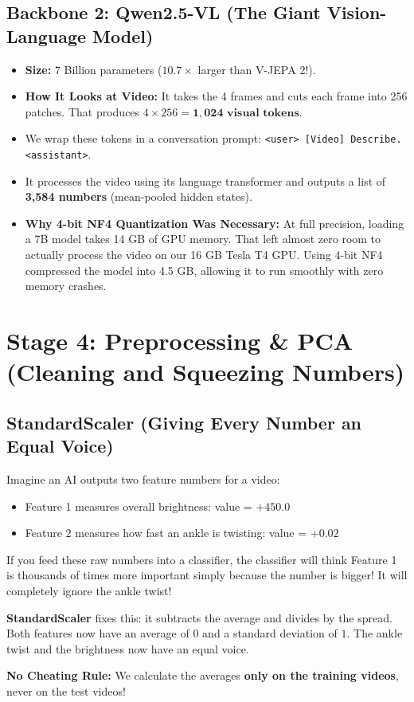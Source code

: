 \documentclass[a4paper, 11pt]{article}
\begin{document}
\subsection{Backbone 2: Qwen2.5-VL (The Giant Vision-Language Model)}
\begin{itemize}
    \item \textbf{Size:} 7 Billion parameters ($10.7\times$ larger than V-JEPA 2!).
    \item \textbf{How It Looks at Video:} It takes the 4 frames and cuts each frame into 256 patches. That produces $4 \times 256 = \mathbf{1,024\text{ visual tokens}}$.
    \item We wrap these tokens in a conversation prompt: \texttt{<user> [Video] Describe. <assistant>}.
    \item It processes the video using its language transformer and outputs a list of \textbf{3,584 numbers} (mean-pooled hidden states).
    \item \textbf{Why 4-bit NF4 Quantization Was Necessary:} At full precision, loading a 7B model takes 14 GB of GPU memory. That left almost zero room to actually process the video on our 16 GB Tesla T4 GPU. Using 4-bit NF4 compressed the model into 4.5 GB, allowing it to run smoothly with zero memory crashes.
\end{itemize}

\section{Stage 4: Preprocessing \& PCA (Cleaning and Squeezing Numbers)}

\subsection{StandardScaler (Giving Every Number an Equal Voice)}
\begin{examplebox}
Imagine an AI outputs two feature numbers for a video:
\begin{itemize}
    \item Feature 1 measures overall brightness: value = \textbf{$+450.0$}
    \item Feature 2 measures how fast an ankle is twisting: value = \textbf{$+0.02$}
\end{itemize}
If you feed these raw numbers into a classifier, the classifier will think Feature 1 is thousands of times more important simply because the number is bigger! It will completely ignore the ankle twist!

\textbf{StandardScaler} fixes this: it subtracts the average and divides by the spread. Both features now have an average of $0$ and a standard deviation of $1$. The ankle twist and the brightness now have an equal voice.

\textbf{No Cheating Rule:} We calculate the averages \textbf{only on the training videos}, never on the test videos!
\end{examplebox}
\end{document}

